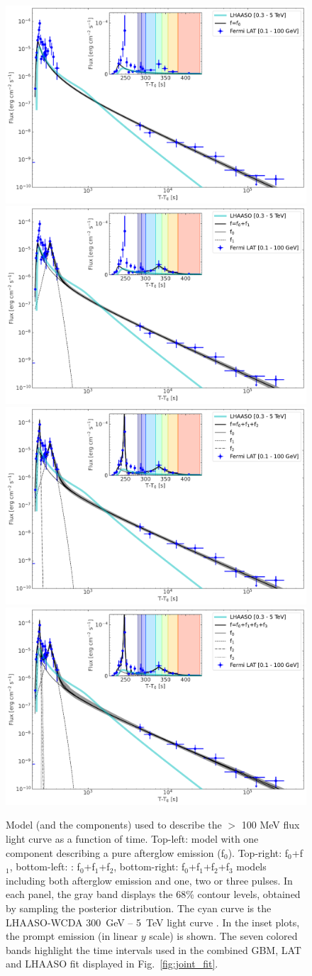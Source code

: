 \documentclass[preprint]{aastex631}
\begin{document}
\begin{figure}[t]
    \centering    
    \includegraphics[width=0.49\linewidth]{lcfit_FS.pdf}
    \includegraphics[width=0.49\linewidth]{lcfit_FS_P1.pdf}
    \includegraphics[width=0.49\linewidth]{lcfit_FS_P1_P2.pdf}
    \includegraphics[width=0.49\linewidth]{lcfit_FS_P1_P2_P3.pdf}

    \caption{Model (and the components) used to describe the $>$ 100 MeV flux light curve as a function of time. Top-left: model with one component describing a pure afterglow emission (f$_{0}$). Top-right: f$_{0}$+f$_{1}$, bottom-left: : f$_{0}$+f$_{1}$+f$_{2}$, bottom-right: f$_{0}$+f$_{1}$+f$_{2}$+f$_{3}$ models including both afterglow emission and one, two or three pulses. In each panel, the gray band displays the 68\% contour levels, obtained by sampling the posterior distribution. The cyan curve is the LHAASO-WCDA 300~GeV -- 5~TeV light curve \citep{BOAT_LHAASO}. In the inset plots, the prompt emission (in linear $y$ scale) is shown. The seven colored bands highlight the time intervals used in the combined \Fermi GBM, \Fermi LAT and LHAASO fit displayed in Fig.~\ref{fig:joint_fit}.}
    \label{fig:lc_models}
\end{figure}
\end{document}
